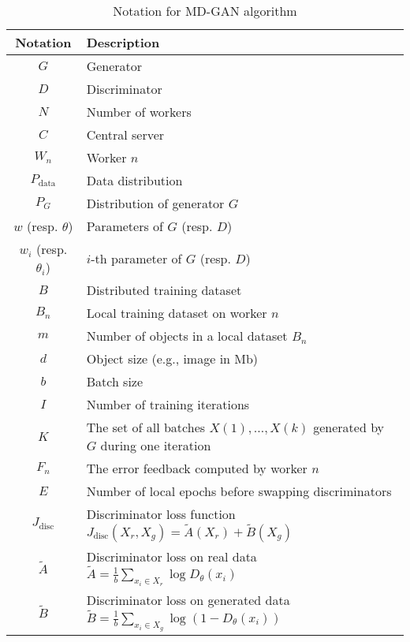 \begin{table}[ht]
    \centering
    \caption{Notation for MD-GAN algorithm}
    \begin{tabular}{|c|m{10cm}|}
    \hline
    \textbf{Notation} & \textbf{Description} \\ \hline
    $G$ & Generator \\ \hline
    $D$ & Discriminator \\ \hline
    $N$ & Number of workers \\ \hline
    $C$ & Central server \\ \hline
    $W_n$ & Worker $n$ \\ \hline
    $P_{\text{data}}$ & Data distribution \\ \hline
    $P_G$ & Distribution of generator $G$ \\ \hline
    $w$ (resp. $\theta$) & Parameters of $G$ (resp. $D$) \\ \hline
    $w_i$ (resp. $\theta_i$) & $i$-th parameter of $G$ (resp. $D$) \\ \hline
    $B$ & Distributed training dataset \\ \hline
    $B_n$ & Local training dataset on worker $n$ \\ \hline
    $m$ & Number of objects in a local dataset $B_n$ \\ \hline
    $d$ & Object size (e.g., image in Mb) \\ \hline
    $b$ & Batch size \\ \hline
    $I$ & Number of training iterations \\ \hline
    $K$ & The set of all batches $X(1), \dots, X(k)$ generated by $G$ during one iteration \\ \hline
    $F_n$ & The error feedback computed by worker $n$ \\ \hline
    $E$ & Number of local epochs before swapping discriminators \\ \hline
    $J_{\text{disc}}$ & Discriminator loss function $J_{\text{disc}}(X_r, X_g) = \tilde{A}(X_r) + \tilde{B}(X_g)$ \\ \hline
    $\tilde{A}$ & Discriminator loss on real data $\tilde{A} = \frac{1}{b} \sum_{x_i \in X_r} \log D_{\theta}(x_i)$ \\ \hline
    $\tilde{B}$ & Discriminator loss on generated data $\tilde{B} = \frac{1}{b} \sum_{x_i \in X_g} \log (1 - D_{\theta}(x_i))$ \\ \hline
    \end{tabular}
\end{table}
